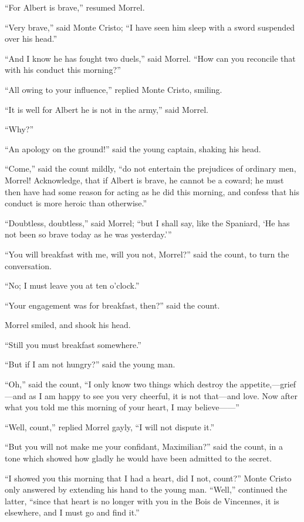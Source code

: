 “For Albert is brave,” resumed Morrel.

“Very brave,” said Monte Cristo; “I have seen him sleep with a sword
suspended over his head.”

“And I know he has fought two duels,” said Morrel. “How can you
reconcile that with his conduct this morning?”

“All owing to your influence,” replied Monte Cristo, smiling.

“It is well for Albert he is not in the army,” said Morrel.

“Why?”

“An apology on the ground!” said the young captain, shaking his head.

“Come,” said the count mildly, “do not entertain the prejudices of
ordinary men, Morrel! Acknowledge, that if Albert is brave, he cannot
be a coward; he must then have had some reason for acting as he did
this morning, and confess that his conduct is more heroic than
otherwise.”

“Doubtless, doubtless,” said Morrel; “but I shall say, like the
Spaniard, ‘He has not been so brave today as he was yesterday.’”

“You will breakfast with me, will you not, Morrel?” said the count, to
turn the conversation.

“No; I must leave you at ten o’clock.”

“Your engagement was for breakfast, then?” said the count.

Morrel smiled, and shook his head.

“Still you must breakfast somewhere.”

“But if I am not hungry?” said the young man.

“Oh,” said the count, “I only know two things which destroy the
appetite,—grief—and as I am happy to see you very cheerful, it is not
that—and love. Now after what you told me this morning of your heart, I
may believe——”

“Well, count,” replied Morrel gayly, “I will not dispute it.”

“But you will not make me your confidant, Maximilian?” said the count,
in a tone which showed how gladly he would have been admitted to the
secret.

“I showed you this morning that I had a heart, did I not, count?” Monte
Cristo only answered by extending his hand to the young man. “Well,”
continued the latter, “since that heart is no longer with you in the
Bois de Vincennes, it is elsewhere, and I must go and find it.”

